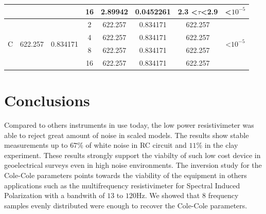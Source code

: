\documentclass{vie16}
\begin{document}
\begin{table}[H]
\begin{adjustbox}{scale=0.9}
\begin{tabular}{@{}|c|c|c|c|c|c|c|c|@{}}
                   &                          &                            & 16                                 & 2.89942         & 0.0452261         & 2.3 \textless$\tau$\textless 2.9  & \textless $10^{-5}$                  \\ \hline
\multirow{4}{*}{C} & \multirow{4}{*}{622.257} & \multirow{4}{*}{0.834171}  & 2                                  & 622.257         & 0.834171          & 622.257                           & \multirow{4}{*}{\textless $10^{-5}$} \\
                   &                          &                            & 4                                  & 622.257         & 0.834171          & 622.257                           &                                      \\
                   &                          &                            & 8                                  & 622.257         & 0.834171          & 622.257                           &                                      \\
                   &                          &                            & 16                                 & 622.257         & 0.834171          & 622.257                           &                                   \\  \hline
\end{tabular}
\end{adjustbox}
\end{table}


\section{Conclusions}

Compared to others instruments in use today, the low power
resistivimeter was able to reject great amount of noise in scaled
models. The results show stable measurements up to $67\%$ of white
noise in RC circuit and $11 \%$ in the clay experiment. These results
strongly support the viabilty of such low cost device in geoelectrical
surveys even in high noise environments. The inversion study for the
Cole-Cole parameters points towards the viability of the equipment in
others applications such as the multifrequency resistivimeter for
Spectral Induced Polarization with a bandwith of $13$ to $120$Hz. We
showed that $8$ frequency samples evenly distributed were enough to
recover the Cole-Cole parameters.



		
\end{document}
